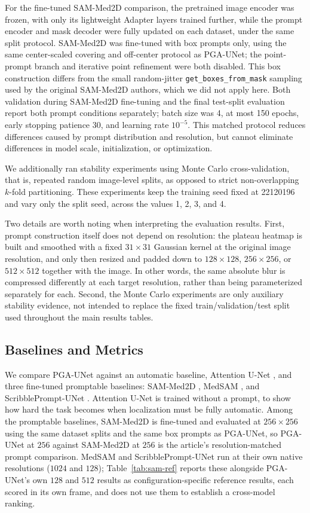 For the fine-tuned SAM-Med2D comparison, the pretrained image encoder was frozen, with only its lightweight Adapter layers trained further, while the prompt encoder and mask decoder were fully updated on each dataset, under the same split protocol. SAM-Med2D was fine-tuned with box prompts only, using the same center-scaled covering and off-center protocol as PGA-UNet; the point-prompt branch and iterative point refinement were both disabled. This box construction differs from the small random-jitter \texttt{get\_boxes\_from\_mask} sampling used by the original SAM-Med2D authors, which we did not apply here. Both validation during SAM-Med2D fine-tuning and the final test-split evaluation report both prompt conditions separately; batch size was 4, at most 150 epochs, early stopping patience 30, and learning rate $10^{-5}$. This matched protocol reduces differences caused by prompt distribution and resolution, but cannot eliminate differences in model scale, initialization, or optimization.

We additionally ran stability experiments using Monte Carlo cross-validation, that is, repeated random image-level splits, as opposed to strict non-overlapping $k$-fold partitioning. These experiments keep the training seed fixed at 22120196 and vary only the split seed, across the values 1, 2, 3, and 4.

Two details are worth noting when interpreting the evaluation results. First, prompt construction itself does not depend on resolution: the plateau heatmap is built and smoothed with a fixed $31\times31$ Gaussian kernel at the original image resolution, and only then resized and padded down to $128\times128$, $256\times256$, or $512\times512$ together with the image. In other words, the same absolute blur is compressed differently at each target resolution, rather than being parameterized separately for each. Second, the Monte Carlo experiments are only auxiliary stability evidence, not intended to replace the fixed train/validation/test split used throughout the main results tables.

\subsection{Baselines and Metrics}
We compare PGA-UNet against an automatic baseline, Attention U-Net \cite{b4}, and three fine-tuned promptable baselines: SAM-Med2D \cite{b2}, MedSAM \cite{b9}, and ScribblePrompt-UNet \cite{b11}. Attention U-Net is trained without a prompt, to show how hard the task becomes when localization must be fully automatic. Among the promptable baselines, SAM-Med2D is fine-tuned and evaluated at $256\times256$ using the same dataset splits and the same box prompts as PGA-UNet, so PGA-UNet at $256$ against SAM-Med2D at $256$ is the article's resolution-matched prompt comparison. MedSAM and ScribblePrompt-UNet run at their own native resolutions ($1024$ and $128$); Table~\ref{tab:sam-ref} reports these alongside PGA-UNet's own $128$ and $512$ results as configuration-specific reference results, each scored in its own frame, and does not use them to establish a cross-model ranking.

